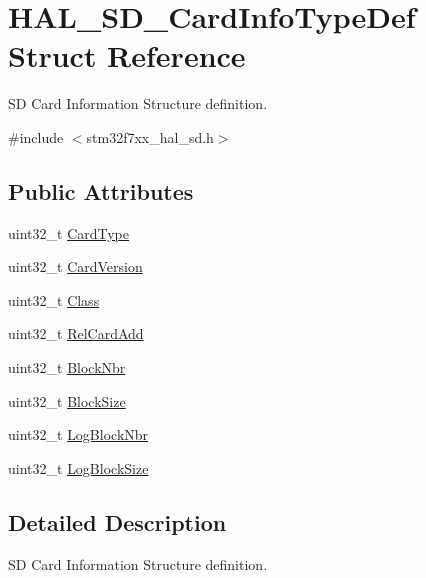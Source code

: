 \hypertarget{struct_h_a_l___s_d___card_info_type_def}{}\section{H\+A\+L\+\_\+\+S\+D\+\_\+\+Card\+Info\+Type\+Def Struct Reference}
\label{struct_h_a_l___s_d___card_info_type_def}


SD Card Information Structure definition.  




{\ttfamily \#include $<$stm32f7xx\+\_\+hal\+\_\+sd.\+h$>$}

\subsection*{Public Attributes}
\begin{DoxyCompactItemize}
\item 
uint32\+\_\+t \mbox{\hyperlink{struct_h_a_l___s_d___card_info_type_def_aa5ffc66f3af1006205dd558d11a968c4}{Card\+Type}}
\item 
uint32\+\_\+t \mbox{\hyperlink{struct_h_a_l___s_d___card_info_type_def_a724b1ac5ad512c3e3cd9af197a395818}{Card\+Version}}
\item 
uint32\+\_\+t \mbox{\hyperlink{struct_h_a_l___s_d___card_info_type_def_af5d12ce5bf2a2db857e885897d272db8}{Class}}
\item 
uint32\+\_\+t \mbox{\hyperlink{struct_h_a_l___s_d___card_info_type_def_afcf32ec3d3ca4d044e6fae91803484ea}{Rel\+Card\+Add}}
\item 
uint32\+\_\+t \mbox{\hyperlink{struct_h_a_l___s_d___card_info_type_def_a044dfb6d3cf9080b7aa343306d74e869}{Block\+Nbr}}
\item 
uint32\+\_\+t \mbox{\hyperlink{struct_h_a_l___s_d___card_info_type_def_a82953396ee8a2710cf41832a025d6986}{Block\+Size}}
\item 
uint32\+\_\+t \mbox{\hyperlink{struct_h_a_l___s_d___card_info_type_def_a0c310d741ec759603768de167e7e7d0b}{Log\+Block\+Nbr}}
\item 
uint32\+\_\+t \mbox{\hyperlink{struct_h_a_l___s_d___card_info_type_def_a7d8165239bc6af33f40d64fb15a0986a}{Log\+Block\+Size}}
\end{DoxyCompactItemize}


\subsection{Detailed Description}
SD Card Information Structure definition. 

